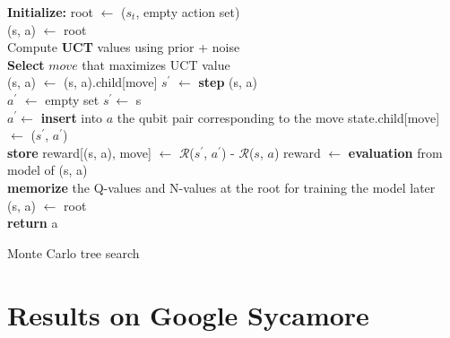 \begin{algorithm}
	\SetAlgoLined
	\DontPrintSemicolon
	\textbf{Initialize:} root $\leftarrow$ ($s_t$, empty action set) \\
	 {
	(s, a) $\gets$ root\\
	 {
		Compute \textbf{UCT} values using prior + noise \\
	    \textbf{Select} $move$ that maximizes UCT value \\
    	 {
    	    (s, a) $\gets$ (s, a).child[move]
    	} {
    		 {
    			$s^\prime$ $\gets$ \textbf{step} (s, a) \\
                $a^\prime$ $\leftarrow$ empty set
            } {
                $s^\prime \gets$ s \\
    		    $a^\prime \gets$ \textbf{insert} into $a$ the qubit pair corresponding to the move
    		}
    	    state.child[move] $\gets$ ($s^\prime$, $a^\prime$) \\
    	    \textbf{store} reward[(s, a), move] $\gets$ $\mathcal{R}$($s^\prime$, $a^\prime$) - $\mathcal{R}$($s$, $a$) 
    	}%
	}%
	    reward $\gets$ \textbf{evaluation} from model of (s, a) \\
    }%
	\textbf{memorize} the Q-values and N-values at the root for training the model later \\
    (s, a)  $\gets$ root \\
    \textbf{return} a
    \caption{Monte Carlo tree search}
\label{algo:mcts}
\end{algorithm}

\section{Results on Google Sycamore}

